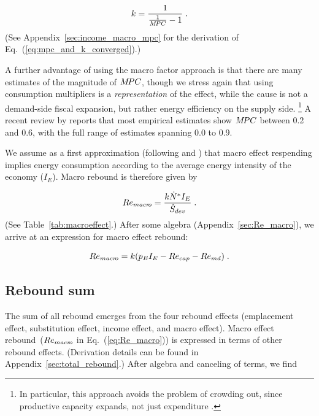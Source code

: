 \documentclass[12pt]{article}\usepackage[]{graphicx}\usepackage[]{xcolor}
\begin{document}
\begin{equation} \label{eq:mpc_and_k_converged}
  k = \frac{1}{\frac{1}{M\!PC} - 1} \; .
\end{equation}
%
(See Appendix~\ref{sec:income_macro_mpc} for the derivation 
of Eq.~(\ref{eq:mpc_and_k_converged}).)

A further advantage of using the macro factor approach is that there are
many estimates of the magnitude of $M\!PC$, 
though we stress again that
using consumption multipliers is a
\emph{representation} of the effect, while the cause is not
a demand-side fiscal expansion, but rather
energy efficiency on the supply side.%
\footnote{
  In particular,
  this approach avoids the problem of crowding out, since
  productive capacity expands, not just expenditure \citep{Gillingham2016}.
}
%
A recent review by \citet{Carroll2017} 
reports that most empirical estimates show $M\!PC$ between 0.2 and 0.6, 
with the full range of estimates spanning 0.0 to 0.9.

We assume as a first approximation
(following \citet{Antal:2014aa} and \citet{Borenstein:2015aa}) that macro effect respending
implies energy consumption according to 
the average energy intensity of the economy ($I_E$).
Macro rebound is therefore given by

\begin{equation} \label{eq:Re_macro_def}
  Re_{macr\!o} = \frac{k {\dot{N}}^* I_E}{\dot{S}_{dev}} \; .
\end{equation}
%
(See Table~\ref{tab:macroeffect}.) 
After some algebra (Appendix~\ref{sec:Re_macro}), 
we arrive at an expression for macro effect rebound:

\begin{equation} \label{eq:Re_macro}
  Re_{macr\!o} = k (p_E I_E - Re_{cap} - Re_{md}){} \; .
\end{equation}
%

\subsection{Rebound sum}
\label{sec:total_rebound_main_paper}

The sum of all rebound emerges from the four rebound effects
(emplacement effect, substitution effect, income effect, and macro effect).
Macro effect rebound~($Re_{macr\!o}$ in Eq.~(\ref{eq:Re_macro}))
is expressed in terms of other rebound effects.
(Derivation details can be found in Appendix~\ref{sec:total_rebound}.)
After algebra and canceling of terms,
we find
\end{document}
